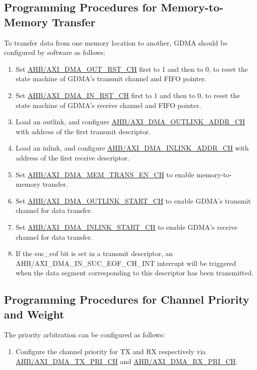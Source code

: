 \documentclass[main\_\_EN.tex]{subfiles}
\begin{document}
\subsection{Programming Procedures for Memory-to-Memory Transfer}
To transfer data from one memory location to another, GDMA should be configured by software as follows:
\begin{enumerate}
    \item Set \hyperref[fielddesc:AHBDMAOUTRSTCHN]{AHB/AXI\_DMA\_OUT\_RST\_CH} first to 1 and then to 0, to reset the state machine of GDMA's transmit channel and FIFO pointer.
    \item Set \hyperref[fielddesc:AHBDMAINRSTCHN]{AHB/AXI\_DMA\_IN\_RST\_CH} first to 1 and then to 0, to reset the state machine of GDMA's receive channel and FIFO pointer.
    \item Load an outlink, and configure \hyperref[fielddesc:AHBDMAOUTLINKADDRCHN]{AHB/AXI\_DMA\_OUTLINK\_ADDR\_CH} with address of the first transmit descriptor.
    \item Load an inlink, and configure \hyperref[fielddesc:AHBDMAINLINKADDRCHN]{AHB/AXI\_DMA\_INLINK\_ADDR\_CH} with address of the first receive descriptor.
    \item Set \hyperref[fielddesc:AHBDMAMEMTRANSENCHN]{AHB/AXI\_DMA\_MEM\_TRANS\_EN\_CH} to enable memory-to-memory transfer.
    \item Set \hyperref[fielddesc:AHBDMAOUTLINKSTARTCHN]{AHB/AXI\_DMA\_OUTLINK\_START\_CH} to enable GDMA's transmit channel for data transfer.
    \item Set \hyperref[fielddesc:AHBDMAINLINKSTARTCHN]{AHB/AXI\_DMA\_INLINK\_START\_CH} to enable GDMA's receive channel for data transfer.
    \item If the suc\_eof bit is set in a transmit descriptor, an AHB/AXI\_DMA\_IN\_SUC\_EOF\_CH\_INT interrupt will be triggered when the data segment corresponding to this descriptor has been transmitted.
\end{enumerate}

\subsection{Programming Procedures for Channel Priority and Weight}

The priority arbitration can be configured as follows:
\begin{enumerate}
    \item Configure the channel priority for TX and RX respectively via \hyperref[fielddesc:AHBDMATXPRICHN]{AHB/AXI\_DMA\_TX\_PRI\_CH} and \hyperref[fielddesc:AHBDMARXPRICHN]{AHB/AXI\_DMA\_RX\_PRI\_CH}.
\end{enumerate}
\end{document}
